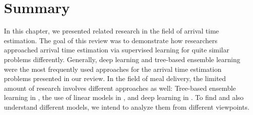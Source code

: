 \section{Summary}

In this chapter, we presented related research in the field of arrival time estimation. The goal of this review was to demonstrate how researchers approached arrival time estimation via supervised learning for quite similar problems differently. Generally, deep learning and tree-based ensemble learning were the most frequently used approaches for the arrival time estimation problems presented in our review. In the field of meal delivery, the limited amount of research involves different approaches as well: Tree-based ensemble learning in \cite{Hildebrandt2020_EAT}, the use of linear models in \cite{Liu2018_LM_PLM}, and deep learning in \cite{Zhu2020_OFCTE_DL}. To find and also understand different models, we intend to analyze them from different viewpoints.